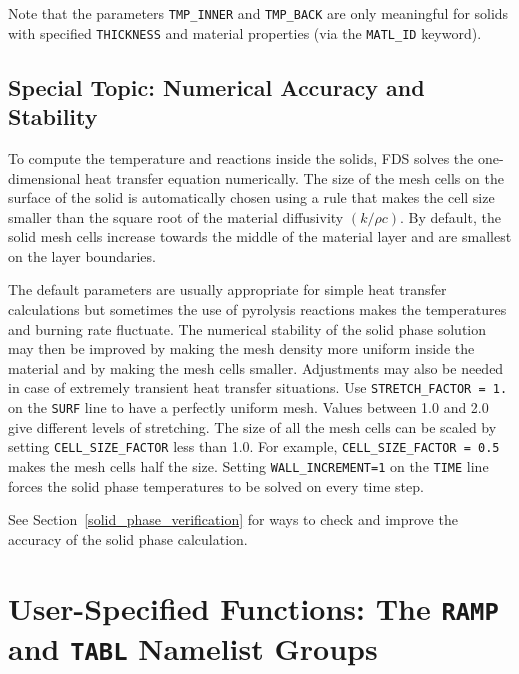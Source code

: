 \documentclass[11pt]{book}
\newcommand{\ct}{\tt\small}
\begin{document}
\begin{warning}
\noindent
Note that the parameters {\ct TMP\_INNER} and {\ct TMP\_BACK} are only meaningful for solids with specified {\ct THICKNESS} and material
properties (via the {\ct MATL\_ID} keyword).
\end{warning}

\subsection{Special Topic: Numerical Accuracy and Stability}

To compute the temperature and reactions inside the solids, FDS solves
the one-dimensional heat transfer equation numerically. The size of
the mesh cells on the surface of the solid is automatically chosen
using a rule that makes the cell size smaller than the square root of
the material diffusivity $(k/\rho c)$. By default, the solid mesh
cells increase towards the middle of the material layer and are smallest
on the layer boundaries.

The default parameters are usually appropriate for simple heat
transfer calculations but sometimes the use of pyrolysis reactions
makes the temperatures and burning rate fluctuate. The numerical
stability of the solid phase solution may then be improved by making
the mesh density more uniform inside the material and by making the
mesh cells smaller. Adjustments may also be needed in case of
extremely transient heat transfer situations. Use {\ct STRETCH\_FACTOR
= 1.} on the {\ct SURF} line to have a perfectly uniform mesh. Values
between 1.0 and 2.0 give different levels of stretching.  The size of
all the mesh cells can be scaled by setting {\ct CELL\_SIZE\_FACTOR}
less than 1.0. For example, {\ct CELL\_SIZE\_FACTOR = 0.5} makes the
mesh cells half the size. Setting {\ct WALL\_INCREMENT=1} on the
{\ct TIME} line forces the solid phase temperatures to be solved on every
time step.

See Section~\ref{solid_phase_verification} for ways to check and improve the accuracy of the solid phase calculation.






\clearpage

\section{User-Specified Functions: The \texorpdfstring{{\tt RAMP}}{RAMP} and \texorpdfstring{{\tt TABL}}{TABL} Namelist Groups}
\label{info:RAMP}
\label{info:TABL}
\end{document}
